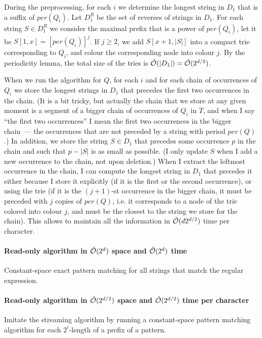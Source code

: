 \documentclass{article}
\begin{document}
During the preprocessing, for each $i$ we determine the longest string in $D_1$ that is a suffix of $per(Q_i)$. Let $D_1^R$ be the set of reverses of strings in $D_1$. For each string $S \in D_1^R$ we consider the maximal prefix that is a power of $per(Q_i)$, let it be $S[1, x] = [per(Q_i)]^j$. If $j \ge 2$, we add $S[x+1,|S|]$ into a compact trie corresponding to $Q_i$, and colour the corresponding node into colour $j$. By the periodicity lemma, the total size of the tries is $\tilde{\mathcal{O}}(|D_1|) = \tilde{\mathcal{O}}(2^{d/2})$. 

When we run the algorithm for $Q$, for each $i$ and for each chain of occurrences of $Q_i$ we store the longest strings in $D_1$ that precedes the first two occurrences in the chain. (It is a bit tricky, but actually the chain that we store at any given moment is a segment of a bigger chain of occurrences of $Q_i$ in $T$, and when I say ``the first two occurrences'' I mean the first two occurrences in the bigger chain~--- the occurrences that are not preceded by a string with period $per(Q)$.) In addition, we store the string $S \in D_1$ that precedes some occurrence $p$ in the chain and such that $p - |S|$ is as small as possible. (I only update $S$ when I add a new occurrence to the chain, not upon deletion.) When I extract the leftmost occurrence in the chain, I can compute the longest string in $D_1$ that precedes it either because I store it explicitly (if it is the first or the second occurrence), or using the trie (if it is the $(j+1)$-st occurrence in the bigger chain, it must be preceded with $j$ copies of $per(Q)$, i.e. it corresponds to a node of the trie colored into colour $j$, and must be the closest to the string we store for the chain). This allows to maintain all the information in $\tilde{\mathcal{O}}(d 2^{d/2})$ time per character.

\paragraph{Read-only algorithm in $\tilde{\mathcal{O}}(2^{d})$ space and $\tilde{\mathcal{O}}(2^{d})$ time} Constant-space exact pattern matching for all strings that match the regular expression. 

\paragraph{Read-only algorithm in $\tilde{\mathcal{O}}(2^{d/2})$ space and $\tilde{\mathcal{O}}(2^{d/2})$ time per character} Imitate the streaming algorithm by running a constant-space pattern matching algorithm for each $2^i$-length of a prefix of a pattern.
\end{document}
